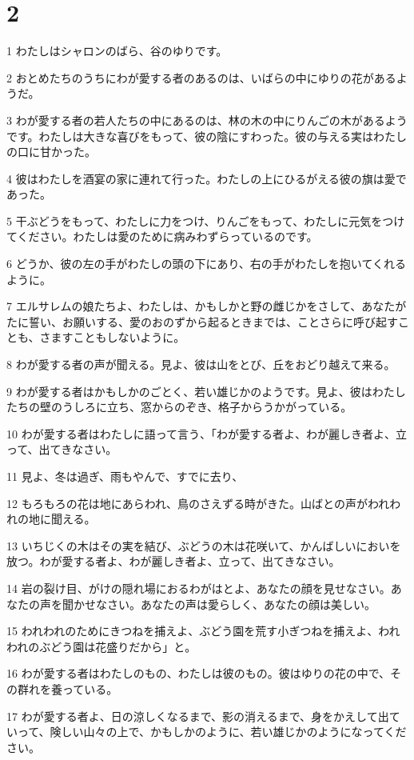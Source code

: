 \chapter{2}

\par 1 わたしはシャロンのばら、谷のゆりです。
\par 2 おとめたちのうちにわが愛する者のあるのは、いばらの中にゆりの花があるようだ。
\par 3 わが愛する者の若人たちの中にあるのは、林の木の中にりんごの木があるようです。わたしは大きな喜びをもって、彼の陰にすわった。彼の与える実はわたしの口に甘かった。
\par 4 彼はわたしを酒宴の家に連れて行った。わたしの上にひるがえる彼の旗は愛であった。
\par 5 干ぶどうをもって、わたしに力をつけ、りんごをもって、わたしに元気をつけてください。わたしは愛のために病みわずらっているのです。
\par 6 どうか、彼の左の手がわたしの頭の下にあり、右の手がわたしを抱いてくれるように。
\par 7 エルサレムの娘たちよ、わたしは、かもしかと野の雌じかをさして、あなたがたに誓い、お願いする、愛のおのずから起るときまでは、ことさらに呼び起すことも、さますこともしないように。
\par 8 わが愛する者の声が聞える。見よ、彼は山をとび、丘をおどり越えて来る。
\par 9 わが愛する者はかもしかのごとく、若い雄じかのようです。見よ、彼はわたしたちの壁のうしろに立ち、窓からのぞき、格子からうかがっている。
\par 10 わが愛する者はわたしに語って言う、「わが愛する者よ、わが麗しき者よ、立って、出てきなさい。
\par 11 見よ、冬は過ぎ、雨もやんで、すでに去り、
\par 12 もろもろの花は地にあらわれ、鳥のさえずる時がきた。山ばとの声がわれわれの地に聞える。
\par 13 いちじくの木はその実を結び、ぶどうの木は花咲いて、かんばしいにおいを放つ。わが愛する者よ、わが麗しき者よ、立って、出てきなさい。
\par 14 岩の裂け目、がけの隠れ場におるわがはとよ、あなたの顔を見せなさい。あなたの声を聞かせなさい。あなたの声は愛らしく、あなたの顔は美しい。
\par 15 われわれのためにきつねを捕えよ、ぶどう園を荒す小ぎつねを捕えよ、われわれのぶどう園は花盛りだから」と。
\par 16 わが愛する者はわたしのもの、わたしは彼のもの。彼はゆりの花の中で、その群れを養っている。
\par 17 わが愛する者よ、日の涼しくなるまで、影の消えるまで、身をかえして出ていって、険しい山々の上で、かもしかのように、若い雄じかのようになってください。

